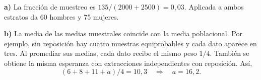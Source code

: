 \textbf{a)} La fracción de muestreo es $135/(2000+2500)=0{,}03$. Aplicada a ambos estratos da 60 hombres y 75 mujeres.

\textbf{b)} La media de las medias muestrales coincide con la media poblacional. Por ejemplo, sin reposición hay cuatro muestras equiprobables y cada dato aparece en tres. Al promediar sus medias, cada dato recibe el mismo peso $1/4$. También se obtiene la misma esperanza con extracciones independientes con reposición. Así,
\[
(6+8+11+a)/4=10{,}3
\quad\Longrightarrow\quad \boxed{a=16{,}2}.
\]
